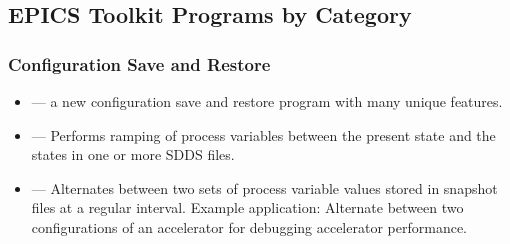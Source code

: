 \documentclass[11pt]{article}
\begin{document}
\subsection{EPICS Toolkit Programs by Category}
\subsubsection{Configuration Save and Restore}
\begin{itemize}
  \item {} --- a new configuration save and restore program with many unique features.
  \item {} --- Performs ramping of process variables between
the present state and the states in one or more SDDS files.
  \item {} --- Alternates between two sets of process variable values stored in snapshot files
        at a regular interval.
        Example application: Alternate between two configurations of an accelerator for debugging
        accelerator performance.
\end{itemize}
\end{document}
